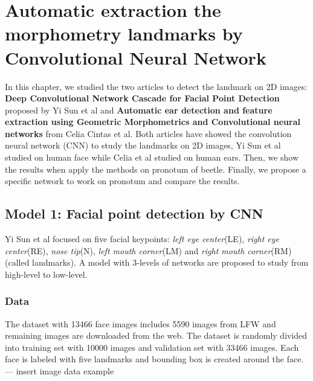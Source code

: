 \chapter{Automatic extraction the morphometry landmarks by Convolutional Neural Network}

In this chapter, we studied the two articles to detect the landmark on 2D images: \textbf{Deep Convolutional Network Cascade for Facial Point Detection} proposed by Yi Sun et al\cite{sun2013deep} and \textbf{Automatic ear detection and feature extraction using Geometric Morphometrics and Convolutional neural networks} from Celia Cintas et al\cite{cintas2016automatic}. Both articles have showed the convolution neural network (CNN) to study the landmarks on 2D images, Yi Sun et al studied on human face while Celia et al studied on human ears. Then, we show the results when apply the methods on pronotum of beetle. Finally, we propose a specific network to work on pronotum and compare the results.
\section{Model 1: Facial point detection by CNN}
Yi Sun et al\cite{sun2013deep} focused on five facial keypoints: \textit{left eye center}(LE), \textit{right eye center}(RE), \textit{nose tip}(N), \textit{left mouth corner}(LM) and \textit{right mouth corner}(RM) (called landmarks). A model with 3-levels of networks are proposed to study from high-level to low-level.
\subsection{Data}
The dataset with 13466 face images includes 5590 images from LFW \cite{huang2007labeled} and remaining images are downloaded from the web. The dataset is randomly divided into training set with 10000 images and validation set with 33466 images. Each face is labeled with five landmarks and bounding box is created around the face. \\
--- insert image data example
